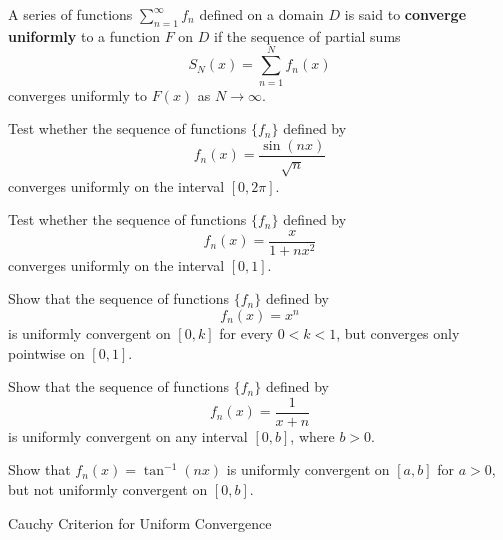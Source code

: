 \documentclass[12pt, a4paper]{article}
\begin{document}
\clearpage

\begin{definition}
    A series of functions $\sum_{n=1}^{\infty} f_n$ defined on a domain $D$ is said to \textbf{converge uniformly} to a function $F$ on $D$ if the sequence of partial sums
    \[
    S_N(x) = \sum_{n=1}^{N} f_n(x)
    \]
converges uniformly to $F(x)$ as $N \to \infty$.
\end{definition}

\clearpage

\begin{problem}
    Test whether the sequence of functions $\{f_n\}$ defined by
    \[
    f_n(x) = \frac{\sin(nx)}{\sqrt{n}}
    \]
    converges uniformly on the interval $[0,2\pi]$.    
\end{problem}

\clearpage

\begin{problem}
    Test whether the sequence of functions $\{f_n\}$ defined by
    \[
    f_n(x) = \frac{x}{1+nx^2}
    \]
    converges uniformly on the interval $[0,1]$.    
\end{problem}

\clearpage

\begin{problem}
Show that the sequence of functions $\{f_n\}$ defined by
\[
f_n(x)=x^n
\]
is uniformly convergent on $[0,k]$ for every $0<k<1$, but converges only pointwise on $[0,1]$.
\end{problem}

\clearpage

\begin{problem}
Show that the sequence of functions $\{f_n\}$ defined by
\[
f_n(x)=\frac{1}{x+n}
\]
is uniformly convergent on any interval $[0,b]$, where $b>0$.
\end{problem}

\clearpage

\begin{problem}
    Show that $f_n(x)=\tan^{-1}(nx)$ is uniformly convergent on $[a,b]$ for $a>0$,
but not uniformly convergent on $[0,b]$.    
\end{problem}

\clearpage

\begin{heading}
    Cauchy Criterion for Uniform Convergence
\end{heading}

\vspace{10pt}
\end{document}
